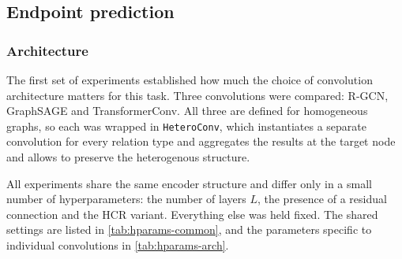 \newpage
\subsection{Endpoint prediction}

\subsubsection{Architecture}

The first set of experiments established how much the choice of
convolution architecture matters for this task. Three convolutions were
compared: R-GCN, GraphSAGE and TransformerConv. All three are defined for
homogeneous graphs, so each was wrapped in \texttt{HeteroConv}, which
instantiates a separate convolution for every relation type and aggregates
the results at the target node and allows to preserve the heterogenous structure. 

All experiments share the same encoder structure and differ only in a small
number of hyperparameters: the number of layers $L$, the presence of a
residual connection and the HCR variant. Everything
else was held fixed. The shared settings are listed in
\cref{tab:hparams-common}, and the parameters specific to individual
convolutions in \cref{tab:hparams-arch}.

